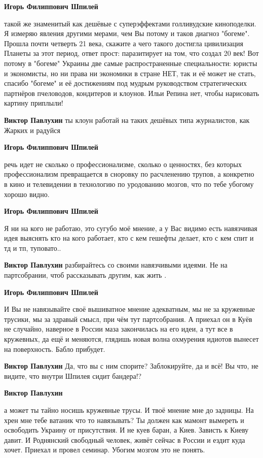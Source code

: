 \begin{itemize}
\begin{itemize}
\textbf{Игорь Филиппович Шпилей} 

такой же знаменитый как дешёвые с суперэффектами голливудские киноподелки. Я
измеряю явления другими мерами, чем Вы потому и таков диагноз "богеме". Прошла
почти четверть 21 века, скажите а чего такого достигла цивилизация Планеты за
этот период, ответ прост: паразитирует на том, что создал 20 век! Вот потому в
"богеме" Украины две самые распространенные специальности: юристы и экономисты,
но ни права ни экономики в стране НЕТ, так и её может не стать, спасибо
"богеме" и её достижениям под мудрым руководством стратегических партнёров
пчеловодов, кондитеров и клоунов. Ильи Репина нет, чтобы нарисовать картину
приплыли!

\textbf{Виктор Павлухин} ты клоун работай на таких дешёвых типа журналистов, как Жарких и радуйся

\textbf{Игорь Филиппович Шпилей} 

речь идет не сколько о профессионализме, сколько о ценностях, без которых
профессионализм превращается в сноровку по расчленению трупов, а конкретно в
кино и телевидении в технологию по уродованию мозгов, что по тебе убогому
хорошо видно.

\textbf{Игорь Филиппович Шпилей} 

Я ни на кого не работаю, это сугубо моё мнение, а у Вас видимо есть навязчивая
идея выяснять кто на кого работает, кто с кем гешефты делает, кто с кем спит и
тд и тп, туповато..

\textbf{Виктор Павлухин} разбирайтесь со своими навязчивыми идеями. Не на партсобрании, чтоб рассказывать другим, как жить .

\textbf{Игорь Филиппович Шпилей} 

И Вы не навязывайте своё вышиватное мнение адекватным, мы не за кружевные
трусики, мы за здравый смысл, при чём тут партсобрания. А приехал он в Куёв не
случайно, наверное в России маза закончилась на его идеи, а тут все в
кружевных, да ещё и меняются, глядишь новая волна охмурения идиотов вынесет на
поверхность. Бабло прибудет.

\textbf{Виктор Павлухин} Да, что вы с ним спорите? Заблокируйте, да и всё! Вы что, не видите, что внутри Шпилея сидит бандера!?

\textbf{Виктор Павлухин} 

а может ты тайно носишь кружевные трусы. И твоё мнение мне до задницы. На хрен
мне тебе ватаник что то навязывать? Ты должен как мамонт вымереть и освободить
Украину от присутствия. И не куев баран, а Киев. Зависть к Киеву давит. И
Роднянский свободный человек, живёт сейчас в России и ездит куда хочет. Приехал
и провел семинар. Убогим мозгом это не понять.


\end{itemize}
\end{itemize}

